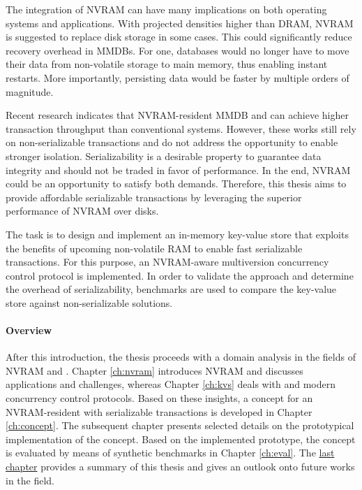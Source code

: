 The integration of \ac{NVRAM} can have many implications on both operating
systems and applications. With projected densities higher than \ac{DRAM},
\ac{NVRAM} is suggested to replace disk storage in some cases. This could
significantly reduce recovery overhead in \acp{MMDB}. For one, databases would
no longer have to move their data from non-volatile storage to main memory, thus
enabling instant restarts. More importantly, persisting data would be faster by
multiple orders of magnitude.


Recent research indicates that NVRAM-resident \ac{MMDB} and \kvsp can achieve
higher transaction throughput than conventional systems. However, these works
still rely on non-serializable transactions and do not address the opportunity
to enable stronger isolation. Serializability is a desirable property to
guarantee data integrity and should not be traded in favor of performance. In
the end, \ac{NVRAM} could be an opportunity to satisfy both demands. Therefore,
this thesis aims to provide affordable serializable transactions by leveraging
the superior performance of \ac{NVRAM} over disks.


The task is to design and implement an in-memory key-value store that exploits
the benefits of upcoming non-volatile \ac{RAM} to enable fast serializable
transactions. For this purpose, an \ac{NVRAM}-aware multiversion concurrency
control protocol is implemented. In order to validate the approach and determine
the overhead of serializability, benchmarks are used to compare the key-value
store against non-serializable solutions.


\paragraph{Overview}

After this introduction, the thesis proceeds with a domain analysis in the
fields of \ac{NVRAM} and \kvsp. Chapter \ref{ch:nvram} introduces \ac{NVRAM} and
discusses applications and challenges, whereas Chapter \ref{ch:kvs} deals with
\kvsp and modern concurrency control protocols. Based on these insights, a
concept for an NVRAM-resident \kvs with serializable transactions is developed
in Chapter \ref{ch:concept}. The subsequent chapter presents selected details on
the prototypical implementation of the concept. Based on the implemented
prototype, the concept is evaluated by means of synthetic benchmarks in Chapter
\ref{ch:eval}. The \hyperref[ch:summary]{last chapter} provides a summary of
this thesis and gives an outlook onto future works in the field.

